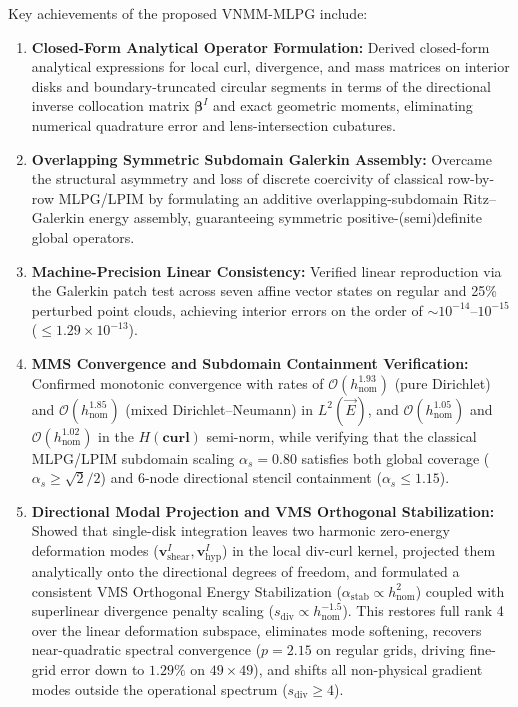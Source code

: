 \documentclass[VANCOUVER,Times1COL]{WileyNJD-v5}
\begin{document}
Key achievements of the proposed VNMM-MLPG include:
\begin{enumerate}
    \item \textbf{Closed-Form Analytical Operator Formulation:} Derived closed-form analytical expressions for local curl, divergence, and mass matrices on interior disks and boundary-truncated circular segments in terms of the directional inverse collocation matrix $\boldsymbol{\beta}^I$ and exact geometric moments, eliminating numerical quadrature error and lens-intersection cubatures.
    \item \textbf{Overlapping Symmetric Subdomain Galerkin Assembly:} Overcame the structural asymmetry and loss of discrete coercivity of classical row-by-row MLPG/LPIM by formulating an additive overlapping-subdomain Ritz--Galerkin energy assembly, guaranteeing symmetric positive-(semi)definite global operators.
    \item \textbf{Machine-Precision Linear Consistency:} Verified linear reproduction via the Galerkin patch test across seven affine vector states on regular and 25\% perturbed point clouds, achieving interior errors on the order of $\sim 10^{-14}\text{--}10^{-15}$ ($\le 1.29 \times 10^{-13}$).
    \item \textbf{MMS Convergence and Subdomain Containment Verification:} Confirmed monotonic convergence with rates of $\mathcal{O}(h_{\mathrm{nom}}^{1.93})$ (pure Dirichlet) and $\mathcal{O}(h_{\mathrm{nom}}^{1.85})$ (mixed Dirichlet--Neumann) in $L^2(\vec{E})$, and $\mathcal{O}(h_{\mathrm{nom}}^{1.05})$ and $\mathcal{O}(h_{\mathrm{nom}}^{1.02})$ in the $H(\mathbf{curl})$ semi-norm, while verifying that the classical MLPG/LPIM subdomain scaling $\alpha_s = 0.80$ \cite{atluri2002meshless, liu2009mesh} satisfies both global coverage ($\alpha_s \ge \sqrt{2}/2$) and 6-node directional stencil containment ($\alpha_s \le 1.15$).
    \item \textbf{Directional Modal Projection and VMS Orthogonal Stabilization:} Showed that single-disk integration leaves two harmonic zero-energy deformation modes ($\mathbf{v}_{\mathrm{shear}}^I, \mathbf{v}_{\mathrm{hyp}}^I$) in the local div-curl kernel, projected them analytically onto the directional degrees of freedom, and formulated a consistent VMS Orthogonal Energy Stabilization ($\alpha_{\mathrm{stab}} \propto h_{\mathrm{nom}}^2$) coupled with superlinear divergence penalty scaling ($s_{\mathrm{div}} \propto h_{\mathrm{nom}}^{-1.5}$). This restores full rank 4 over the linear deformation subspace, eliminates mode softening, recovers near-quadratic spectral convergence ($p = 2.15$ on regular grids, driving fine-grid error down to $1.29\%$ on $49\times 49$), and shifts all non-physical gradient modes outside the operational spectrum ($s_{\mathrm{div}} \ge 4$).

\end{enumerate}
\end{document}
